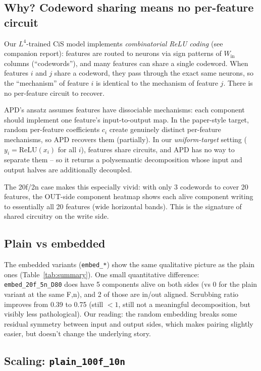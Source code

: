 \documentclass[11pt]{article}
\newcommand{\Wein}{W_{\mathrm{in}}}
\begin{document}
\subsection{Why? Codeword sharing means no per-feature circuit}

Our $L^4$-trained CiS model implements \emph{combinatorial ReLU coding}
(see companion report): features are routed to neurons via sign patterns
of $\Wein$ columns (``codewords''), and many features can share a single
codeword. When features $i$ and $j$ share a codeword, they pass through
the exact same neurons, so the ``mechanism'' of feature $i$ is identical
to the mechanism of feature $j$. There is no per-feature circuit to
recover.

APD's ansatz assumes features have dissociable mechanisms: each component
should implement one feature's input-to-output map. In the paper-style
target, random per-feature coefficients $c_i$ create genuinely distinct
per-feature mechanisms, so APD recovers them (partially). In our
\emph{uniform-target} setting ($y_i = \mathrm{ReLU}(x_i)$ for all $i$),
features share circuits, and APD has no way to separate them -- so it
returns a polysemantic decomposition whose input and output halves are
additionally decoupled.

The 20f/2n case makes this especially vivid: with only 3 codewords to
cover 20 features, the OUT-side component heatmap shows each alive
component writing to essentially all 20 features (wide horizontal
bands). This is the signature of shared circuitry on the write side.

\subsection{Plain vs embedded}

The embedded variants (\texttt{embed\_*}) show the same qualitative
picture as the plain ones (Table~\ref{tab:summary}). One small
quantitative difference: \texttt{embed\_20f\_5n\_D80} does have 5
components alive on both sides (vs 0 for the plain variant at the same
F,n), and 2 of those are in/out aligned. Scrubbing ratio improves from
0.39 to 0.75 (still $< 1$, still not a meaningful decomposition, but
visibly less pathological). Our reading: the random embedding breaks
some residual symmetry between input and output sides, which makes
pairing slightly easier, but doesn't change the underlying story.

\subsection{Scaling: \texttt{plain\_100f\_10n}}
\end{document}
